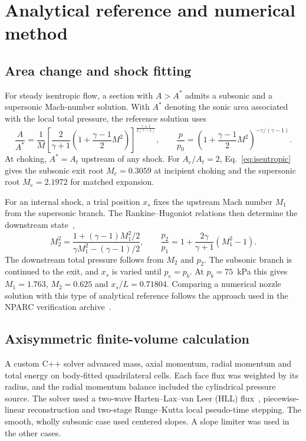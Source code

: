 \documentclass[11pt,a4paper]{article}
\begin{document}
\newpage
\section{Analytical reference and numerical method}
\subsection{Area change and shock fitting}
For steady isentropic flow, a section with $A>A^*$ admits a subsonic and a supersonic Mach-number solution. With $A^*$ denoting the sonic area associated with the local total pressure, the reference solution uses~\cite{ames}
\begin{equation}
 \frac{A}{A^*}=\frac{1}{M}
 \left[\frac{2}{\gamma+1}\left(1+\frac{\gamma-1}{2}M^2\right)\right]^{\frac{\gamma+1}{2(\gamma-1)}},
 \qquad
 \frac{p}{p_0}=\left(1+\frac{\gamma-1}{2}M^2\right)^{-\gamma/(\gamma-1)}.
 \label{eq:isentropic}
\end{equation}
At choking, $A^*=A_t$ upstream of any shock. For $A_e/A_t=2$, Eq.~\eqref{eq:isentropic} gives the subsonic exit root $M_e=0.3059$ at incipient choking and the supersonic root $M_e=2.1972$ for matched expansion.

For an internal shock, a trial position $x_s$ fixes the upstream Mach number $M_1$ from the supersonic branch. The Rankine--Hugoniot relations then determine the downstream state~\cite{ames},
\begin{equation}
 M_2^2=\frac{1+(\gamma-1)M_1^2/2}{\gamma M_1^2-(\gamma-1)/2},
 \qquad
 \frac{p_2}{p_1}=1+\frac{2\gamma}{\gamma+1}(M_1^2-1).
 \label{eq:shock}
\end{equation}
The downstream total pressure follows from $M_2$ and $p_2$. The subsonic branch is continued to the exit, and $x_s$ is varied until $p_e=p_b$. At $p_b=75$~kPa this gives $M_1=1.763$, $M_2=0.625$ and $x_s/L=0.71804$. Comparing a numerical nozzle solution with this type of analytical reference follows the approach used in the NPARC verification archive~\cite{cdv}.

\subsection{Axisymmetric finite-volume calculation}
A custom C++ solver advanced mass, axial momentum, radial momentum and total energy on body-fitted quadrilateral cells. Each face flux was weighted by its radius, and the radial momentum balance included the cylindrical pressure source. The solver used a two-wave Harten--Lax--van Leer (HLL) flux~\cite{riemann}, piecewise-linear reconstruction and two-stage Runge--Kutta local pseudo-time stepping. The smooth, wholly subsonic case used centered slopes. A slope limiter was used in the other cases.
\end{document}
